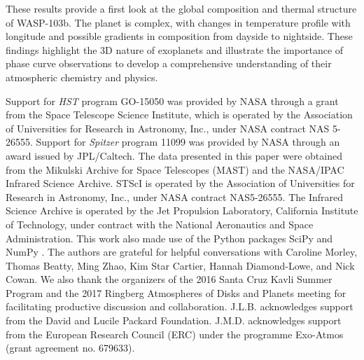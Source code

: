 \documentclass[twocolumn]{aastex61}
\begin{document}
These results provide a first look at the global composition and thermal structure of WASP-103b.  The planet is complex, with changes in temperature profile with longitude and possible gradients in composition from dayside to nightside. These findings highlight the 3D nature of exoplanets and illustrate the importance of phase curve observations to develop a comprehensive understanding of their atmospheric chemistry and physics.




\acknowledgments
Support for \textit{HST} program GO-15050 was provided by NASA through a grant from the Space Telescope Science Institute, which is operated by the Association of Universities for Research in Astronomy, Inc., under NASA contract NAS 5-26555. Support for \textit{Spitzer} program 11099 was provided by NASA through an award issued by JPL/Caltech.  The data presented in this paper were obtained from the Mikulski Archive for Space Telescopes (MAST) and the NASA/IPAC Infrared Science Archive. STScI is operated by the Association of Universities for Research in Astronomy, Inc., under NASA contract NAS5-26555. The Infrared Science Archive is operated by the Jet Propulsion Laboratory, California Institute of Technology, under contract with the National Aeronautics and Space Administration.  This work also made use of the Python packages  SciPy and NumPy \citep{jones_scipy_2001, van2011numpy}. The authors are grateful for helpful conversations with Caroline Morley, Thomas Beatty, Ming Zhao, Kim Star Cartier, Hannah Diamond-Lowe, and Nick Cowan. We also thank the organizers of the 2016 Santa Cruz Kavli Summer Program and the 2017 Ringberg Atmospheres of Disks and Planets meeting for facilitating productive discussion and collaboration.  J.L.B. acknowledges support from the David and Lucile Packard Foundation.  J.M.D. acknowledges support from the European Research Council (ERC) under the programme Exo-Atmos (grant agreement no. 679633).



\end{document}
